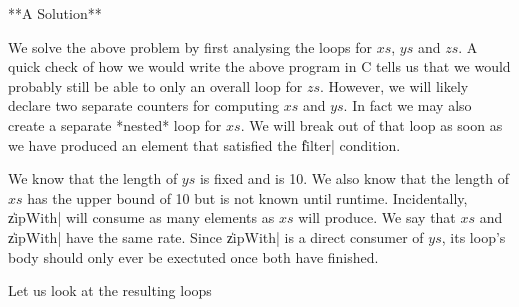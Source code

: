 \documentclass[preamble.tex]{subfiles}
\begin{document}
**A Solution**

We solve the above problem by first analysing the loops for $xs$, $ys$ and $zs$. A quick check of how we would write the above program in C tells us that we would probably still be able to only an overall loop for $zs$. However, we will likely declare two separate counters for computing $xs$ and $ys$. In fact we may also create a separate *nested* loop for $xs$. We will break out of that loop as soon as we have produced an element that satisfied the \|filter| condition.

We know that the length of $ys$ is fixed and is 10. We also know that the length of $xs$ has the upper bound of 10 but is not known until runtime. Incidentally, \|zipWith| will consume as many elements as $xs$ will produce. We say that $xs$ and \|zipWith| have the same rate. Since \|zipWith| is a direct consumer of $ys$, its loop's body should only ever be exectuted once both have finished.

Let us look at the resulting loops
\end{document}
